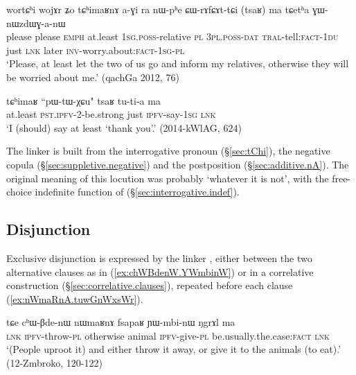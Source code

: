 \begin{exe}
\ex \label{ex:tChimaRnA.CWrAfCAttCi}
\gll wortɕʰi wojɤr ʑo tɕʰimaʁnɤ a-ɣi ra nɯ-pʰe ɕɯ-rɤfɕɤt-tɕi (tsaʁ) ma tɕetʰa ɣɯ-nɯzdɯɣ-a-nɯ \\
please please \textsc{emph} at.least \textsc{1sg}.\textsc{poss}-relative \textsc{pl} \textsc{3pl}.\textsc{poss}-\textsc{dat} \textsc{tral}-tell:\textsc{fact}-\textsc{1du} just \textsc{lnk} later \textsc{inv}-worry.about:\textsc{fact}-\textsc{1sg}-\textsc{pl} \\
\glt `Please, at least let the two of us go and inform my relatives, otherwise they will be worried about me.' (qachGa 2012, 76)
\end{exe} 

\begin{exe}
\ex \label{ex:tChimaR.tsaR}
\gll  tɕʰimaʁ ``pɯ-tɯ-χɕu" tsaʁ tu-ti-a ma \\
at.least \textsc{pst}.\textsc{ipfv}-2-be.strong just \textsc{ipfv}-say-\textsc{1sg} \textsc{lnk} \\
\glt `I (should) say at least `thank you'.' (2014-kWlAG, 624)
\end{exe} 

The linker  is built from the interrogative pronoun  (§\ref{sec:tChi}), the negative copula  (§\ref{sec:suppletive.negative}) and the postposition  (§\ref{sec:additive.nA}). The original meaning of this locution was probably `whatever it is not', with the free-choice indefinite function of  (§\ref{sec:interrogative.indef}).

\subsection{Disjunction} \label{sec:disjunction.clauses}
Exclusive disjunction is expressed by the linker , either between the two alternative clauses as in (\ref{ex:chWBdenW.YWmbinW}) or in a correlative construction (§\ref{sec:correlative.clauses}), repeated before each clause (\ref{ex:nWmaRnA.tuwGnWxsWr}).

\begin{exe}
\ex \label{ex:chWBdenW.YWmbinW}
\gll tɕe cʰɯ-βde-nɯ nɯmaʁnɤ fsapaʁ ɲɯ-mbi-nɯ ŋgrɤl ma \\
\textsc{lnk} \textsc{ipfv}-throw-\textsc{pl} otherwise animal \textsc{ipfv}-give-\textsc{pl} be.usually.the.case:\textsc{fact} \textsc{lnk} \\
\glt `(People uproot it) and either throw it away, or give it to the animals (to eat).' (12-Zmbroko, 120-122)
\end{exe} 

